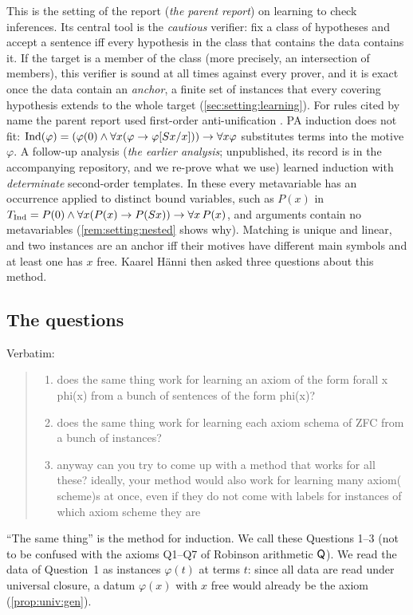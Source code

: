 This is the setting of the report \citet{claude2026whatfollows} (\emph{the parent report}) on learning to check
inferences. Its central tool is the \emph{cautious} verifier: fix a class of hypotheses and accept a sentence iff every
hypothesis in the class that contains the data contains it. If the target is a member of the class (more precisely, an
intersection of members), this verifier is sound at all times against every prover, and it is exact once the data
contain an \emph{anchor}, a finite set of instances that every covering hypothesis extends to the whole target
(\cref{sec:setting:learning}). For rules cited by name the parent report used first-order anti-unification
\citep{plotkin1970note,reynolds1970transformational}. PA induction does not fit: $\mathrm{Ind}(\varphi)=(\varphi(0)\wedge\forall
x(\varphi\to\varphi[Sx/x]))\to\forall x\varphi$ substitutes terms into the motive $\varphi$. A follow-up analysis
(\emph{the earlier analysis}; unpublished, its record is in the accompanying repository, and we re-prove what we use)
learned induction with \emph{determinate} second-order templates. In these every metavariable has an occurrence applied
to distinct bound variables, such as $P(x)$ in $T_{\mathrm{Ind}}=P(0)\wedge\forall x(P(x)\to P(Sx))\to\forall x\,P(x)$, and
arguments contain no metavariables (\cref{rem:setting:nested} shows why). Matching is unique and linear, and two
instances are an anchor iff their motives have different main symbols and at least one has $x$ free. Kaarel H\"anni then
asked three questions about this method.

\subsection{The questions}\label{sec:intro:questions}

Verbatim:
\begin{quote}
\begin{enumerate}[label=\arabic*.,leftmargin=1.5em]
\item does the same thing work for learning an axiom of the form forall x phi(x) from a bunch of sentences of the form
  phi(x)?
\item does the same thing work for learning each axiom schema of ZFC from a bunch of instances?
\item anyway can you try to come up with a method that works for all these? ideally, your method would also work for
  learning many axiom( scheme)s at once, even if they do not come with labels for instances of which axiom scheme they
  are
\end{enumerate}
\end{quote}
``The same thing'' is the method for induction. We call these Questions 1--3 (not to be confused with the axioms Q1--Q7
of Robinson arithmetic $\mathsf{Q}$). We read the data of Question~1 as instances $\varphi(t)$ at terms $t$: since all data are
read under universal closure, a datum $\varphi(x)$ with $x$ free would already be the axiom (\cref{prop:univ:gen}).

